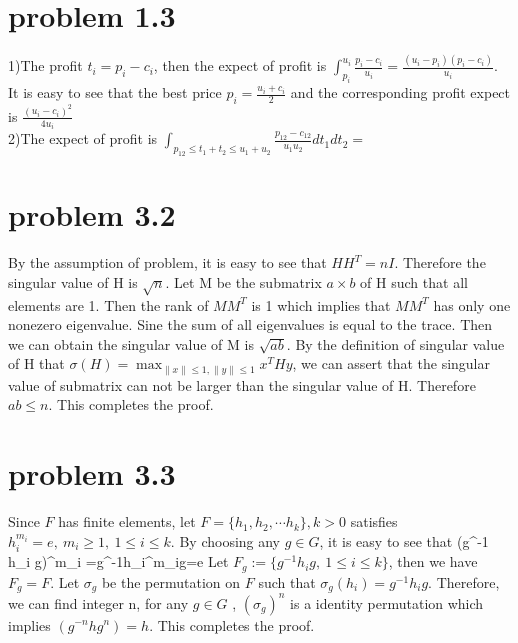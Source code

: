 \documentclass[12pt]{iopart}
\begin{document}
\section{problem 1.3}
 
1)The profit $t_i=p_i- c_i$, then the expect of profit is $\int_{p_i}^{u_i}\frac{p_i-c_i}{u_i}=\frac{(u_i-p_i)(p_i-c_i)}{u_i}$. It is easy to see that the best price $p_i=\frac{u_i+c_i}{2}$ and the corresponding profit expect is $\frac{(u_i-c_i)^2}{4 u_i}$
\\
2)The expect of profit is $\int_{p_{12}\leq t_1+t_2\leq u_1+u_2}\frac{p_{12}-c_{12}}{u_1 u_2}dt_1dt_2=$
\section{problem 3.2}
By the assumption of problem, it is easy to see that $HH^T= n I$. Therefore the singular value of H is $\sqrt{n}$. Let M be the submatrix $a\times b $ of H such that all elements are 1. Then the rank of $MM^T$ is 1 which implies that $MM^T$ has only one nonezero eigenvalue. Sine the sum of all eigenvalues is equal to the trace. Then we can obtain the singular value of M is $\sqrt{ab}$. By the definition of singular value of H that $\sigma(H)=\max_{\|x\|\leq1,\|y\|\leq1}x^T Hy$, we can assert that the singular value of submatrix can not be larger than the singular value of H. Therefore $ab\leq n$. This completes the proof.




\section{problem 3.3}
Since $F$ has finite elements, let $F=\{h_1,h_2,\cdots h_k\},k>0$ satisfies $h_i^{m_i}=e, \ m_i\geq1, \ 1\leq i\leq k$. By choosing any $g\in G$, it is easy to see that 
\ben
(g^{-1} h_i g)^{m_i} =g^{-1}h_i^{m_i}g=e
\een
Let $F_g:=\{g^{-1}h_i g , \ 1\leq i\leq k\}$, then we have $F_g=F$. Let $\sigma_g $ be the permutation on $F$ such that $\sigma_g(h_i)=g^{-1}h_i g$. Therefore, we can find integer n, for any $g\in G$ , $(\sigma_g)^n$ is a identity permutation which implies $(g^{-n}hg^n)=h$. This completes the proof.
\end{document}
